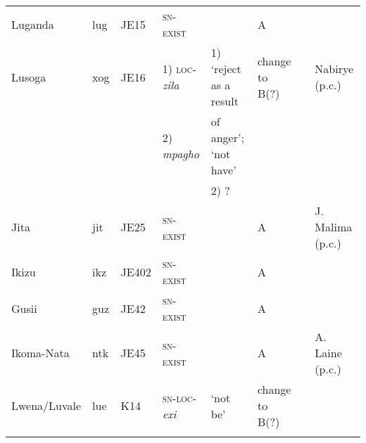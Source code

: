 \documentclass[output=paper,draft,draftmode,colorlinks,citecolor=brown]{langscibook}
\begin{document}
\begin{paperappendix}
\begin{sidewaystable}[p]
\begin{tabularx}{\textwidth}{llllllQQ}
{Luganda}	&{lug}		&{JE15}	&\textsc{sn-exist}	&\textendash								&A{}	&												&\citet{AshtonMulira1954}\\
{Lusoga}	&{xog}	&{JE16}	&1) \textsc{loc}-\textit{zila}&1) `reject as a result			&change to B(?) 	&												&Nabirye (p.c.)\\
				&				&				&2) \textit{mpagho} &of anger'; `not have'\\
				&				&				&				&2) ?\\
{Jita}		&{jit}		&{JE25}	&\textsc{sn-exist}	&\textendash								&A{}	& 												&J. Malima (p.c.)\\
{Ikizu} 	&{ikz}		&{JE402}	&\textsc{sn-exist}	&\textendash								&A{}	& 												&\citet{Gray2013}\\
{Gusii} 	&{guz} 	&{JE42} 	&\textsc{sn-exist}	&\textendash								&A{}	& 												&\citet{Whiteley1956}\\
{Ikoma-Nata}&{ntk}	&{JE45} 	&\textsc{sn-exist}	&\textendash								&A{}	& 												&A. Laine (p.c.)\\
{Lwena/Luvale} &{lue}&{K14}	&\textsc{sn-loc}-\textit{exi}&`not be'						&change to B(?)	&												&\citet{Horton1949}\\
\lspbottomrule
\end{tabularx}
\end{sidewaystable}


\end{paperappendix}
\end{document}
